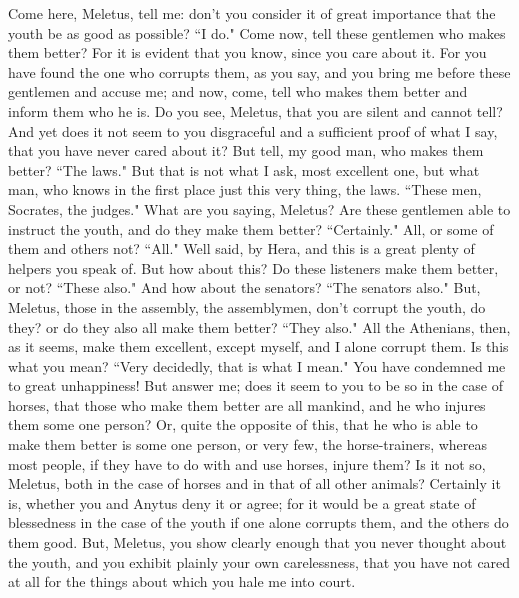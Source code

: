 \documentclass[letterpaper,12pt]{article}
\newcommand{\stephpag}[1]{\marginnote{\small\itshape\fontfamily{ppl}\selectfont #1}}
\begin{document}
Come here, Meletus, tell me: don't you consider it \stephpag{d} of great importance that the youth be as good as possible? ``I do." Come now, tell these gentlemen who makes them better? For it is evident that you know, since you care about it. For you have found the one who corrupts them, as you say, and you bring me before these gentlemen and accuse me; and now, come, tell who makes them better and inform them who he is. Do you see, Meletus, that you are silent and cannot tell? And yet does it not seem to you disgraceful and a sufficient proof of what I say, that you have never cared about it? But tell, my good man, who \stephpag{e} makes them better? ``The laws." But that is not what I ask, most excellent one, but what man, who knows in the first place just this very thing, the laws. ``These men, Socrates, the judges." What are you saying, Meletus? Are these gentlemen able to instruct the youth, and do they make them better? ``Certainly." All, or some of them and others not? ``All." Well said, by Hera, and this is a great plenty of helpers you speak of. But how about this? \stephpag{25 a} Do these listeners make them better, or not? ``These also." And how about the senators? ``The senators also." But, Meletus, those in the assembly, the assemblymen, don't corrupt the youth, do they? or do they also all make them better? ``They also." All the Athenians, then, as it seems, make them excellent, except myself, and I alone corrupt them. Is this what you mean? ``Very decidedly, that is what I mean." You have condemned me to great unhappiness! But answer me; does it seem to you to be so in the case of horses, that those who \stephpag{b} make them better are all mankind, and he who injures them some one person? Or, quite the opposite of this, that he who is able to make them better is some one person, or very few, the horse-trainers, whereas most people, if they have to do with and use horses, injure them? Is it not so, Meletus, both in the case of horses and in that of all other animals? Certainly it is, whether you and Anytus deny it or agree; for it would be a great state of blessedness in the case of the youth if one alone corrupts them, and the others do them good. But, \stephpag{c} Meletus, you show clearly enough that you never thought about the youth, and you exhibit plainly your own carelessness, that you have not cared at all for the things about which you hale me into court.
\end{document}
